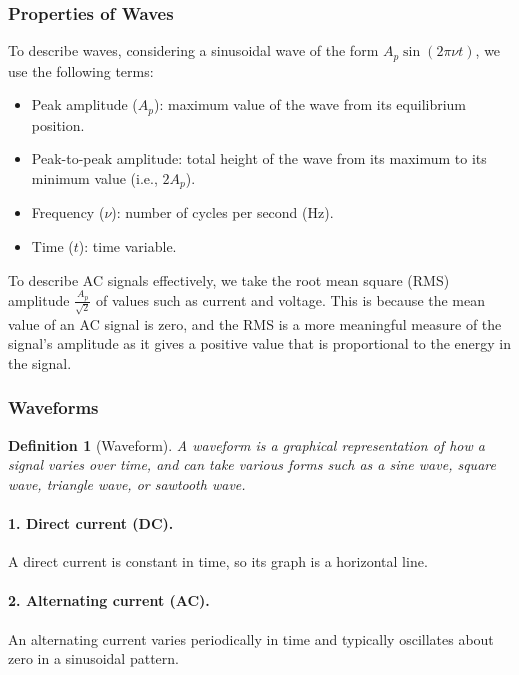 \documentclass{article}
\newtheorem{definition}{Definition}
\begin{document}
\subsubsection{Properties of Waves}
To describe waves, considering a sinusoidal wave of the form \(A_p\sin(2\pi\nu t)\), we use the following terms:
\begin{itemize}
    \item Peak amplitude (\(A_p\)): maximum value of the wave from its equilibrium position.
    \item Peak-to-peak amplitude: total height of the wave from its maximum to its minimum value (i.e., \(2A_p\)).
    \item Frequency (\(\nu\)): number of cycles per second (Hz).
    \item Time (\(t\)): time variable.
\end{itemize}
To describe AC signals effectively, we take the root mean square (RMS) amplitude \(\frac{A_p}{\sqrt{2}}\) of values such as current and voltage. This is because the mean value of an AC signal is zero, and the RMS is a more meaningful measure of the signal's amplitude as it gives a positive value that is proportional to the energy in the signal.

\subsubsection{Waveforms}
\begin{definition}[Waveform]
    A waveform is a graphical representation of how a signal varies over time, and can take various forms such as a sine wave, square wave, triangle wave, or sawtooth wave.
\end{definition}

\paragraph{1. Direct current (DC).}
A direct current is constant in time, so its graph is a horizontal line.
\begin{center}
\end{center}

\paragraph{2. Alternating current (AC).}
An alternating current varies periodically in time and typically oscillates about zero in a sinusoidal pattern.
\begin{center}
\end{center}
\end{document}
